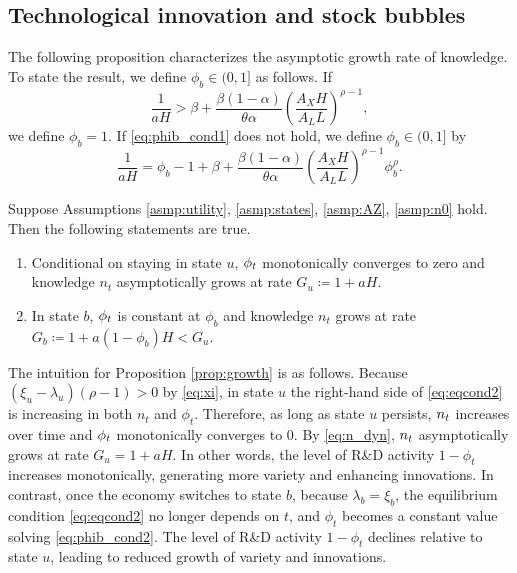 \documentclass[a4paper,12pt]{article}
\numberwithin{equation}{section}
\theoremstyle{plain}
\begin{document}
\subsection{Technological innovation and stock bubbles}

The following proposition characterizes the asymptotic growth rate of knowledge. To state the result, we define $\phi_b\in (0,1]$ as follows. If
\begin{equation}
    \frac{1}{aH}>\beta+\frac{\beta(1-\alpha)}{\theta\alpha}\left(\frac{A_XH}{A_LL}\right)^{\rho-1}, \label{eq:phib_cond1}
\end{equation}
we define $\phi_b=1$. If \eqref{eq:phib_cond1} does not hold, we define $\phi_b\in (0,1]$ by
\begin{equation}
    \frac{1}{aH}=\phi_b-1+\beta+\frac{\beta(1-\alpha)}{\theta\alpha}\left(\frac{A_XH}{A_LL}\right)^{\rho-1}\phi_b^\rho. \label{eq:phib_cond2}
\end{equation}

\begin{prop}\label{prop:growth}
Suppose Assumptions \ref{asmp:utility}, \ref{asmp:states}, \ref{asmp:AZ}, \ref{asmp:n0} hold. Then the following statements are true.
\begin{enumerate}
    \item\label{item:growth_u} Conditional on staying in state $u$, $\set{\phi_t}$ monotonically converges to zero and knowledge $n_t$ asymptotically grows at rate $G_u\coloneqq 1+aH$.
    \item\label{item:growth_b} In state $b$, $\set{\phi_t}$ is constant at $\phi_b$ and knowledge $n_t$ grows at rate $G_b\coloneqq 1+a(1-\phi_b)H<G_u$.
\end{enumerate}
\end{prop}

The intuition for Proposition \ref{prop:growth} is as follows. Because $(\xi_u-\lambda_u)(\rho-1)>0$ by \eqref{eq:xi}, in state $u$ the right-hand side of \eqref{eq:eqcond2} is increasing in both $n_t$ and $\phi_t$. Therefore, as long as state $u$ persists, $\set{n_t}$ increases over time and $\set{\phi_t}$ monotonically converges to 0. By \eqref{eq:n_dyn}, $\set{n_t}$ asymptotically grows at rate $G_u=1+aH$. In other words, the level of R\&D activity $1-\phi_t$ increases monotonically, generating more variety and enhancing innovations. In contrast, once the economy switches to state $b$, because $\lambda_b=\xi_b$, the equilibrium condition \eqref{eq:eqcond2} no longer depends on $t$, and $\phi_t$ becomes a constant value solving \eqref{eq:phib_cond2}. The level of R\&D activity $1-\phi_t$ declines relative to state $u$, leading to reduced growth of variety and innovations.
\end{document}
